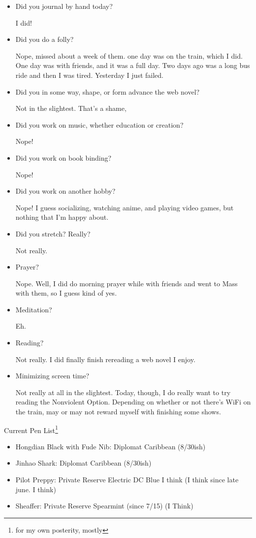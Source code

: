 \documentclass[12pt]{article}
\renewcommand{\,}{\textsuperscript{,}}
\begin{document}
\begin{itemize}

\item Did you journal by hand today?

I did!

\item Did you do a folly?

Nope, missed about a week of them. one day was on the train, which I did.  
One day was with friends, and it was a full day.  
Two days ago was a long bus ride and then I was tired.  
Yesterday I just failed.

\item Did you in some way, shape, or form advance the web novel?

Not in the slightest.  
That's a shame,

\item Did you work on music, whether education or creation?

Nope!

\item Did you work on book binding?

Nope!

\item Did you work on another hobby?

Nope! I guess socializing, watching anime, and playing video games, but nothing that I'm happy about.

\item Did you stretch? Really?

Not really.

\item Prayer?

Nope. Well, I did do morning prayer while with friends and went to Mass with them, so I guess kind of yes.

\item Meditation?

Eh.

\item Reading?

Not really. I did finally finish rereading a web novel I enjoy.

\item Minimizing screen time?

Not really at all in the slightest.  
Today, though, I do really want to try reading the Nonviolent Option.  
Depending on whether or not there's WiFi on the train, may or may not reward myself with finishing some shows.

\end{itemize}

Current Pen List\footnote{for my own posterity, mostly}

\begin{itemize}  
\item Hongdian Black with Fude Nib: Diplomat Caribbean (8/30ish)  
\item Jinhao Shark: Diplomat Caribbean (8/30ish)  
\item Pilot Preppy: Private Reserve Electric DC Blue I think (I think since late june. I think)  
\item Sheaffer: Private Reserve Spearmint (since 7/15) (I Think)

\end{itemize}
\end{document}
